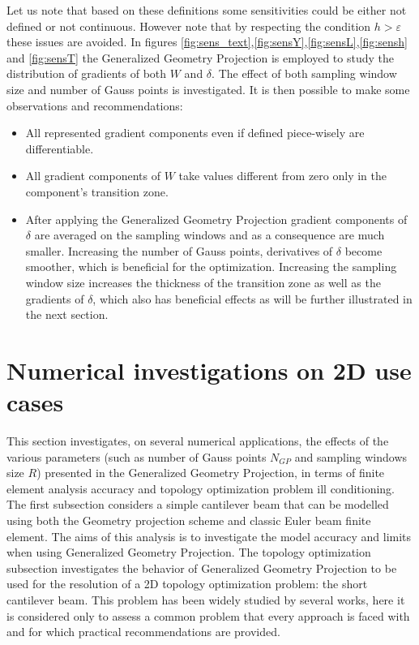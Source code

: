 Let us note that based on these definitions some sensitivities could be either not defined or not continuous. However note that by respecting the condition $h>\varepsilon$ these issues are avoided. In figures \ref{fig:sens_text},\ref{fig:sensY},\ref{fig:sensL},\ref{fig:sensh} and \ref{fig:sensT} the Generalized Geometry Projection is employed to study the distribution of gradients of both $W$ and $\delta$. The effect of both sampling window size and number of Gauss points is investigated. It is then possible to make some observations and recommendations:
\begin{itemize}
    \item All represented gradient components even if defined piece-wisely are differentiable.
    \item All gradient components of $W$ take values different from zero only in the component's transition zone. 
    \item After applying the Generalized Geometry Projection gradient components of $\delta$ are averaged on the sampling windows and as a consequence are much smaller. Increasing the number of Gauss points, derivatives of $\delta$ become smoother, which is beneficial for the optimization. Increasing the sampling window size increases the thickness of the transition zone as well as the gradients of $\delta$, which also has beneficial effects as will be further illustrated in the next section.
\end{itemize}
\section{Numerical investigations on 2D use cases}
\label{I}
This section investigates, on several numerical applications, the effects of the various parameters (such as number of Gauss points $N_{GP}$ and sampling windows size $R$) presented in the Generalized Geometry Projection, in terms of finite element analysis accuracy and topology optimization problem ill conditioning. The first subsection considers a simple cantilever beam that can be modelled using both the Geometry projection scheme and classic Euler beam finite element. The aims of this analysis is to investigate the model accuracy and limits when using Generalized Geometry Projection. The topology optimization subsection investigates the behavior of  Generalized Geometry Projection to be used for the resolution of a 2D topology optimization problem: the short cantilever beam. This problem has been widely studied by several works, here it is considered only to assess a common problem that every approach is faced with and for which practical recommendations are provided.
